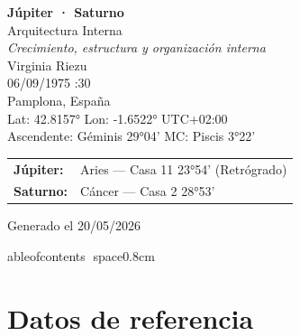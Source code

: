 \documentclass[11pt,a4paper]{article}
\begin{document}

\begin{titlepage}
\centering

\vspace*{2cm}

{\Huge\bfseries\color{azulai} Júpiter · Saturno}\\[0.4cm]

{\large\color{grisai} Arquitectura Interna}\\[0.25cm]

{\small\itshape\color{grisai}
Crecimiento, estructura y organización interna
}\\[1.8cm]

{\huge\color{doradoai} Virginia Riezu}\\[1.2cm]

{\Large 06/09/1975 :30}\\[0.25cm]

{\Large Pamplona, España}\\[0.25cm]

{\normalsize
Lat: 42.8157° \quad
Lon: -1.6522° \quad
UTC+02:00
}\\[0.4cm]

{\normalsize
Ascendente: Géminis 29°04'
\quad
MC: Piscis 3°22'
}\\[1.6cm]

\begin{tabular}{ll}
\textbf{Júpiter:} & Aries — Casa 11 23°54' (Retrógrado) \\
\textbf{Saturno:} & Cáncer — Casa 2 28°53' \\
\end{tabular}

\vfill

{\small\color{grisai}
Generado el 20/05/2026
}

\end{titlepage}

	ableofcontents
space{0.8cm}


\section{Datos de referencia}
\end{document}
